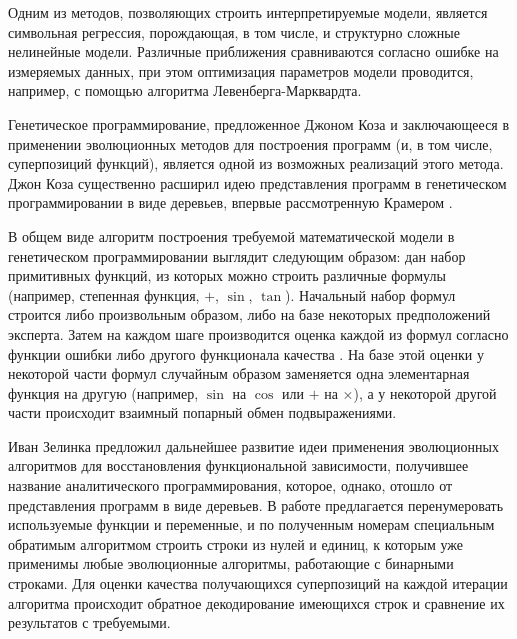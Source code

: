 \documentclass[12pt,a4paper]{article}
\begin{document}
Одним из методов, позволяющих строить интерпретируемые модели, является
символьная регрессия\cite{davidson:2000:snrea,reference/ml/X10vc,StrijovW10,Strijov08InductMethods,Rudoy13},
порождающая, в том числе, и структурно сложные нелинейные модели. Различные
приближения сравниваются согласно ошибке на измеряемых данных, при этом оптимизация
параметров модели проводится, например, с помощью алгоритма Левенберга-Марквардта\cite{Marquardt1963Algorithm,more:78}.

Генетическое программирование, предложенное Джоном Коза и заключающееся в
применении эволюционных методов для построения программ (и, в том числе,
суперпозиций функций), является одной
из возможных реализаций этого метода. Джон Коза
существенно расширил идею представления программ в генетическом
программировании в виде деревьев, впервые рассмотренную Крамером
\cite{Cramer1985}.

В общем виде алгоритм построения требуемой математической модели в
генетическом программировании выглядит следующим образом:
дан набор примитивных функций, из которых можно строить различные формулы
(например, степенная функция, $+$, $\sin$, $\tan$). Начальный набор формул
строится либо произвольным образом, либо на базе некоторых предположений
эксперта. Затем на каждом шаге производится оценка каждой из формул согласно
функции ошибки либо другого функционала качества \cite{Tirsin2005}. На базе
этой оценки у некоторой части формул случайным образом заменяется одна
элементарная функция на другую (например, $\sin$ на $\cos$ или $+$ на
$\times$), а у некоторой другой части происходит взаимный попарный обмен
подвыражениями.

Иван Зелинка предложил дальнейшее развитие идеи применения эволюционных
алгоритмов для восстановления функциональной зависимости, получившее
название аналитического программирования, которое, однако, отошло от
представления программ в виде деревьев. В работе \cite{Zelinka2008}
предлагается перенумеровать используемые функции и переменные, и по
полученным номерам специальным обратимым алгоритмом строить строки из
нулей и единиц, к которым уже применимы любые эволюционные алгоритмы,
работающие с бинарными строками. Для оценки качества получающихся
суперпозиций на каждой итерации алгоритма происходит обратное декодирование
имеющихся строк и сравнение их результатов с требуемыми.

\end{document}
